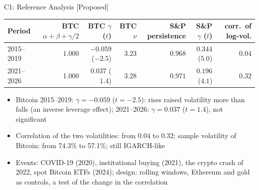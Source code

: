 \ifsolutions
\begin{frame}{C1: Reference Analysis [Proposed]}
\itemsize{\footnotesize}
\begin{center}
\scriptsize
\begin{tabular}{lrrrrrr}
\toprule
Period & BTC $\alpha + \beta + \gamma/2$ & BTC $\gamma$ ($t$) & BTC $\nu$ & S\&P persistence & S\&P $\gamma$ ($t$) & corr.\ of log-vol. \\
\midrule
2015--2019 & 1.000 & $-0.059$ ($-2.5$) & $3.23$ & $0.968$ & $0.344$ ($5.0$) & $0.04$ \\
2021--2026 & 1.000 & $0.037$ ($1.4$) & $3.28$ & $0.971$ & $0.196$ ($4.1$) & $0.32$ \\
\bottomrule
\end{tabular}
\end{center}
\begin{itemize}
    \item Bitcoin 2015--2019: $\gamma = -0.059$ ($t = -2.5$): rises raised volatility more than falls (an inverse leverage effect); 2021--2026: $\gamma = 0.037$ ($t = 1.4$), not significant
    \item Correlation of the two volatilities: from $0.04$ to $0.32$; sample volatility of Bitcoin: from 74.3\% to 57.1\%; still IGARCH-like
    \item Events: COVID-19 (2020), institutional buying (2021), the crypto crash of 2022, spot Bitcoin ETFs (2024); design: rolling windows, Ethereum and gold as controls, a test of the change in the correlation
\end{itemize}
\end{frame}
\fi

